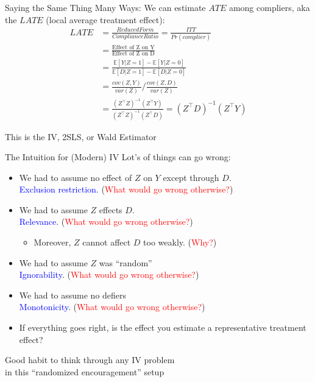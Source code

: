 \documentclass[xcolor=dvipsnames]{beamer}
\newcommand\E{\mathbb{E}}
\begin{document}
\begin{frame}{Saying the Same Thing Many Ways:}
 We can estimate $ATE$ among compliers,  aka the $LATE$ (local average treatment effect): \\
\footnotesize
\begin{align*}
LATE &= \frac{Reduced Form}{Compliance Ratio}= \frac{ITT}{Pr(complier)} \\
&= \frac{\text{Effect of Z on Y}}{\text{Effect of Z on D}} \\
&= \frac{\E[Y|Z=1]-\E[Y|Z=0]}{\E[D|Z=1]-\E[D|Z=0]} \\
&= \frac{cov(Z,Y)}{var(Z)}/\frac{cov(Z,D)}{var(Z)}\\
&= \frac{(Z^{\top}Z)^{-1}(Z^{\top}Y)}{(Z^{\top}Z)^{-1}(Z^{\top}D)} = (Z^{\top}D)^{-1} (Z^{\top}Y) 
\end{align*}
\smallskip
\normalsize
\begin{center}
\color{Blue}
 This is the IV, 2SLS, or Wald Estimator
\end{center}
\end{frame}


\begin{frame}{The Intuition for (Modern) IV}
  Lot's of things can go wrong: \\
\small
\begin{itemize}
\item<2-> We had to assume no effect of $Z$ on $Y$ except through $D$.\\ \textcolor{Blue}{Exclusion restriction.} (\textcolor{Red}{What would go wrong otherwise?}) 
\smallskip
\item<3-> We had to assume $Z$ effects $D$.\\  \textcolor{Blue}{Relevance}. (\textcolor{Red}{What would go wrong otherwise?}) 
\begin{itemize}
\item<3-> Moreover, $Z$ cannot affect $D$ too weakly. (\textcolor{Red}{Why?})
\end{itemize}
\smallskip
\item<4-> We had to assume $Z$ was ``random''\\ \textcolor{Blue}{Ignorability}.  (\textcolor{Red}{What would go wrong otherwise?}) 
\smallskip
\item<5-> We had to assume no defiers\\ \textcolor{Blue}{Monotonicity}. (\textcolor{Red}{What would go wrong otherwise?}) 
\item<6-> If everything goes right, is the effect you estimate a representative treatment effect? 
\end{itemize}
\normalsize
\smallskip
{} \begin{center}
Good habit to think through any IV problem \\ in this ``randomized encouragement'' setup
\end{center}
\end{frame}
\end{document}

